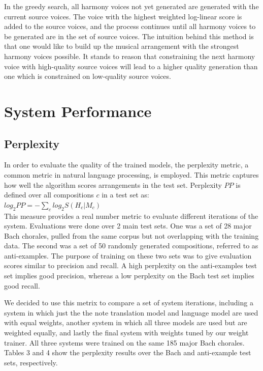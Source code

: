 \documentclass{sig-alternate}
\begin{document}
In the greedy search, all harmony voices not yet generated are generated with the current source voices. The voice with the highest weighted log-linear score is added to the source voices, and the process continues until all harmony voices to be generated are in the set of source voices. The intuition behind this method is that one would like to build up the musical arrangement with the strongest harmony voices possible.
It stands to reason that constraining the next harmony voice with high-quality source voices will lead to a higher quality generation than one which is constrained on low-quality source voices.

\section{System Performance}
\label{sec:sys_perform}
\subsection{Perplexity}
In order to evaluate the quality of the trained models, the perplexity metric, a common metric in natural language processing, is employed. This metric captures how well the algorithm scores arrangements in the test set. Perplexity $PP$ \cite{Koehn:2010:SMT:1734086} is defined over all compositions $c$ in a test set as:\\

$log_2 PP = - \sum_{c} log_2 S(H_{c} | M_{c})$\\

This measure provides a real number metric to evaluate different iterations of the system. Evaluations were done over 2 main test sets. One was a set of 28 major Bach chorales, pulled from the same corpus but not overlapping with the training data. The second was a set of 50 randomly generated compositions, referred to as anti-examples. The purpose of training on these two sets was to give evaluation scores similar to precision and recall. A high perplexity on the anti-examples test set implies good precision, whereas a low perplexity on the Bach test set implies good recall. 	

We decided to use this metrix to compare a set of system iterations, including a system in which just the the note translation model and language model are used with equal weights, another system in which all three models are used but are weighted equally, and lastly the final system with weights tuned by our weight trainer. All three systems were trained on the same 185 major Bach chorales. Tables 3 and 4 show the perplexity results over the Bach and anti-example test sets, respectively. 
\end{document}
